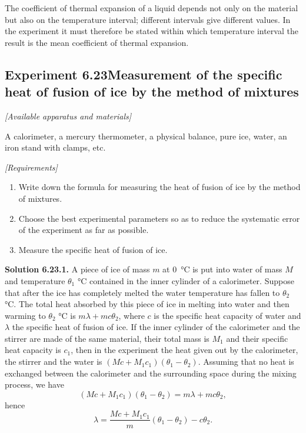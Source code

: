 \begin{commentary}
The coefficient of thermal expansion of a liquid depends not only on the material but also on the temperature interval; different intervals give different values. In the experiment it must therefore be stated within which temperature interval the result is the mean coefficient of thermal expansion.
\end{commentary}


\subsection*{Experiment 6.23\quad Measurement of the specific heat of fusion of ice by the method of mixtures}

\noindent\textit{[Available apparatus and materials]}

A calorimeter, a mercury thermometer, a physical balance, pure ice, water, an iron stand with clamps, etc.

\noindent\textit{[Requirements]}
\begin{enumerate}[label=(\arabic*),leftmargin=2.2em,itemsep=1pt,topsep=2pt]
\item Write down the formula for measuring the heat of fusion of ice by the method of mixtures.
\item Choose the best experimental parameters so as to reduce the systematic error of the experiment as far as possible.
\item Measure the specific heat of fusion of ice.
\end{enumerate}

\medskip
\noindent\textbf{Solution 6.23.}\quad \textbf{1.} A piece of ice of mass $m$ at \SI{0}{\celsius} is put into water of mass $M$ and temperature $\theta_1$ \si{\celsius} contained in the inner cylinder of a calorimeter. Suppose that after the ice has completely melted the water temperature has fallen to $\theta_2$ \si{\celsius}. The total heat absorbed by this piece of ice in melting into water and then warming to $\theta_2$ \si{\celsius} is $m\lambda+mc\theta_2$, where $c$ is the specific heat capacity of water and $\lambda$ the specific heat of fusion of ice. If the inner cylinder of the calorimeter and the stirrer are made of the same material, their total mass is $M_1$ and their specific heat capacity is $c_1$, then in the experiment the heat given out by the calorimeter, the stirrer and the water is $(Mc+M_1c_1)(\theta_1-\theta_2)$. Assuming that no heat is exchanged between the calorimeter and the surrounding space during the mixing process, we have
\begin{equation*}
(Mc+M_1c_1)(\theta_1-\theta_2)=m\lambda+mc\theta_2 ,
\end{equation*}
hence
\begin{equation}\tag{1}
\lambda=\frac{Mc+M_1c_1}{m}(\theta_1-\theta_2)-c\theta_2 .
\end{equation}

